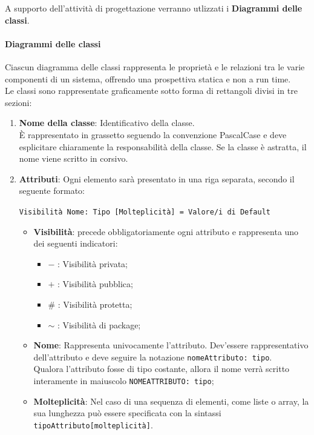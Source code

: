 A supporto dell'attività di progettazione verranno utlizzati i \textbf{Diagrammi delle classi}. \\

\paragraph*{Diagrammi delle classi}
Ciascun diagramma delle classi rappresenta le proprietà e le relazioni tra le varie componenti di un sistema, offrendo una prospettiva statica e non a run time. \\
Le classi sono rappresentate graficamente sotto forma di rettangoli divisi in tre sezioni:
\begin{enumerate}
    \item \textbf{Nome della classe}: Identificativo della classe. \\
    È rappresentato in grassetto seguendo la convenzione PascalCase e deve esplicitare chiaramente la responsabilità della classe. Se la classe è astratta, il nome viene scritto in corsivo.
    \item \textbf{Attributi}: Ogni elemento sarà presentato in una riga separata, secondo il seguente formato: \\
    \begin{center}\texttt{Visibilità Nome: Tipo [Molteplicità] = Valore/i di Default}\end{center}
    \begin{itemize}
        \item \textbf{Visibilità}: precede obbligatoriamente ogni attributo e rappresenta uno dei seguenti indicatori:
        \begin{itemize}
            \item $-$ : Visibilità privata;
            \item $+$ : Visibilità pubblica;
            \item $\#$ : Visibilità protetta;
            \item $\sim$ : Visibilità di package;
        \end{itemize}
        \item \textbf{Nome}: Rappresenta univocamente l'attributo. Dev'essere rappresentativo dell'attributo e deve seguire la notazione \texttt{nomeAttributo: tipo}. \\
        Qualora l'attributo fosse di tipo costante, allora il nome verrà scritto interamente in maiuscolo \texttt{NOMEATTRIBUTO: tipo};
        \item \textbf{Molteplicità}: Nel caso di una sequenza di elementi, come liste o array, la sua lunghezza può essere specificata con la sintassi \texttt{tipoAttributo[molteplicità]}. \\

\end{itemize}
\end{enumerate}
